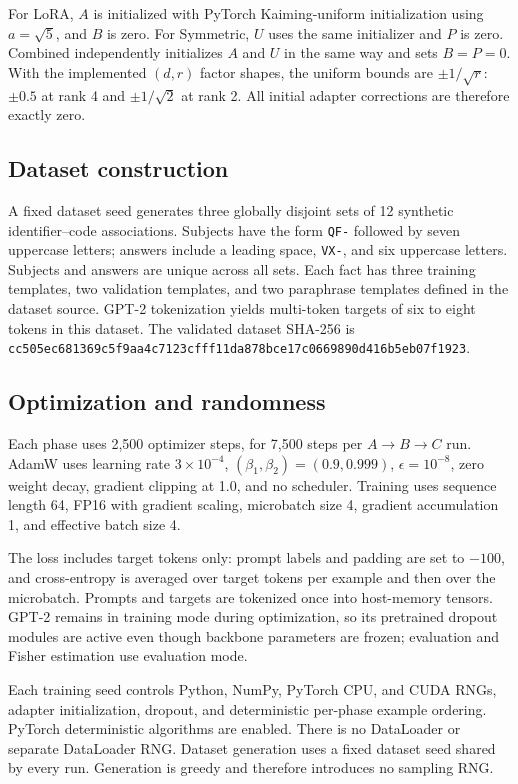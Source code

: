 \documentclass[12pt,a4paper]{article}
\begin{document}
For LoRA, \(A\) is initialized with PyTorch Kaiming-uniform initialization using \(a=\sqrt{5}\), and \(B\) is zero. For Symmetric, \(U\) uses the same initializer and \(P\) is zero. Combined independently initializes \(A\) and \(U\) in the same way and sets \(B=P=0\). With the implemented \((d,r)\) factor shapes, the uniform bounds are \(\pm1/\sqrt r\): \(\pm0.5\) at rank 4 and \(\pm1/\sqrt2\) at rank 2. All initial adapter corrections are therefore exactly zero.

\subsection{Dataset construction}
A fixed dataset seed generates three globally disjoint sets of 12 synthetic identifier–code associations. Subjects have the form \texttt{QF-} followed by seven uppercase letters; answers include a leading space, \texttt{VX-}, and six uppercase letters. Subjects and answers are unique across all sets. Each fact has three training templates, two validation templates, and two paraphrase templates defined in the dataset source. GPT-2 tokenization yields multi-token targets of six to eight tokens in this dataset. The validated dataset SHA-256 is \texttt{cc505ec6\allowbreak 81369c5f\allowbreak 9aa4c712\allowbreak 3cfff11d\allowbreak a878bce1\allowbreak 7c066989\allowbreak 0d416b5e\allowbreak b07f1923}.

\subsection{Optimization and randomness}
Each phase uses 2,500 optimizer steps, for 7,500 steps per \(A\rightarrow B\rightarrow C\) run. AdamW uses learning rate \(3\times10^{-4}\), \((\beta_1,\beta_2)=(0.9,0.999)\), \(\epsilon=10^{-8}\), zero weight decay, gradient clipping at 1.0, and no scheduler. Training uses sequence length 64, FP16 with gradient scaling, microbatch size 4, gradient accumulation 1, and effective batch size 4.

The loss includes target tokens only: prompt labels and padding are set to \(-100\), and cross-entropy is averaged over target tokens per example and then over the microbatch. Prompts and targets are tokenized once into host-memory tensors. GPT-2 remains in training mode during optimization, so its pretrained dropout modules are active even though backbone parameters are frozen; evaluation and Fisher estimation use evaluation mode.

Each training seed controls Python, NumPy, PyTorch CPU, and CUDA RNGs, adapter initialization, dropout, and deterministic per-phase example ordering. PyTorch deterministic algorithms are enabled. There is no DataLoader or separate DataLoader RNG. Dataset generation uses a fixed dataset seed shared by every run. Generation is greedy and therefore introduces no sampling RNG.
\end{document}
